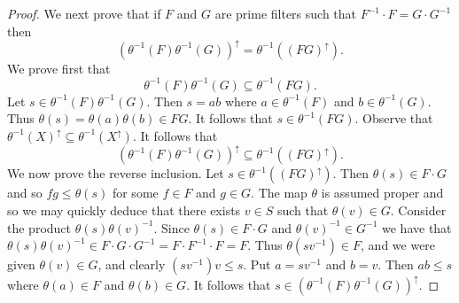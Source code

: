 \documentclass[a4paper]{amsart}
\begin{document}
\begin{proof}
We next prove that if $F$ and $G$ are prime filters such that $F^{-1} \cdot F = G \cdot G^{-1}$ then
$$( \theta^{-1} (F) \theta^{-1} (G) )^{\uparrow} = \theta^{-1} ( (FG)^{\uparrow}  ).$$
We prove first that
$$\theta^{-1} (F) \theta^{-1} (G) \subseteq \theta^{-1} (FG).$$
Let $s \in \theta^{-1} (F) \theta^{-1} (G)$.
Then $s = ab$ where $a \in \theta^{-1} (F)$ and $b \in \theta^{-1} (G)$.
Thus $\theta (s) = \theta (a) \theta (b) \in FG$.
It follows that $s \in \theta^{-1} (FG)$.
Observe that $\theta^{-1} (X)^{\uparrow} \subseteq \theta^{-1} (X^{\uparrow})$.
It follows that
$$( \theta^{-1} (F) \theta^{-1} (G) )^{\uparrow} \subseteq \theta^{-1} ( (FG)^{\uparrow}  ).$$
We now prove the reverse inclusion.
Let $s \in \theta^{-1} ( (FG)^{\uparrow} ).$
Then $\theta (s) \in F \cdot G$ and so
$fg \leq \theta(s)$ for some $f \in F$ and $g \in G$.
The map $\theta$ is assumed proper and so we may quickly deduce that there exists $v \in S$ such that $\theta (v) \in G$.
Consider the product $\theta (s) \theta (v)^{-1}$.
Since $\theta (s) \in F \cdot G$ and $\theta (v)^{-1} \in G^{-1}$ we have that
$\theta (s)\theta (v)^{-1} \in F \cdot G \cdot G^{-1} = F \cdot F^{-1} \cdot F = F$.
Thus $\theta (sv^{-1}) \in F$,  and we were given $\theta (v) \in G$, and clearly $(sv^{-1})v \leq s$.
Put $a = sv^{-1}$ and $b = v$.
Then $ab \leq s$ where $\theta (a) \in F$ and $\theta (b) \in G$.
It follows that $s \in (\theta^{-1} (F) \theta^{-1} (G) )^{\uparrow}$.


\end{proof}
\end{document}
